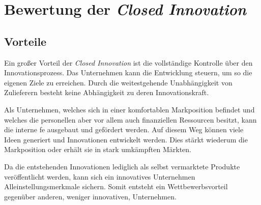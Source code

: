\section{Bewertung der \textit{Closed Innovation}}\label{sec:bewertung}


\subsection{Vorteile}\label{sec:bewertung-vor}
Ein großer Vorteil der \textit{Closed Innovation} ist die vollständige Kontrolle über den Innovationsprozess.
Das Unternehmen kann die Entwicklung steuern,
um so die eigenen Ziele zu erreichen.
Durch die weitestgehende Unabhängigkeit von Zulieferern besteht keine Abhängigkeit zu deren Innovationskraft.

Als Unternehmen, welches sich in einer komfortablen Markposition befindet
und welches die personellen aber vor allem auch finanziellen Ressourcen besitzt,
kann die interne \ac{fe} ausgebaut und gefördert werden.
Auf diesem Weg können viele Ideen generiert und Innovationen entwickelt werden.
Dies stärkt wiederum die Markposition oder erhält sie in stark umkämpften Märkten.

Da die entstehenden Innovationen lediglich als selbst vermarktete Produkte veröffentlicht werden,
kann sich ein innovatives Unternehmen Alleinstellungsmerkmale sichern.
Somit entsteht ein Wettbewerbsvorteil gegenüber anderen,
weniger innovativen, Unternehmen.

